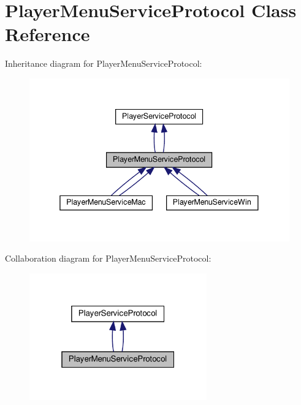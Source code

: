 \hypertarget{classPlayerMenuServiceProtocol}{}\section{Player\+Menu\+Service\+Protocol Class Reference}
\label{classPlayerMenuServiceProtocol}


Inheritance diagram for Player\+Menu\+Service\+Protocol\+:
\nopagebreak
\begin{figure}[H]
\begin{center}
\leavevmode
\includegraphics[width=338pt]{classPlayerMenuServiceProtocol__inherit__graph}
\end{center}
\end{figure}


Collaboration diagram for Player\+Menu\+Service\+Protocol\+:
\nopagebreak
\begin{figure}[H]
\begin{center}
\leavevmode
\includegraphics[width=217pt]{classPlayerMenuServiceProtocol__coll__graph}
\end{center}
\end{figure}
